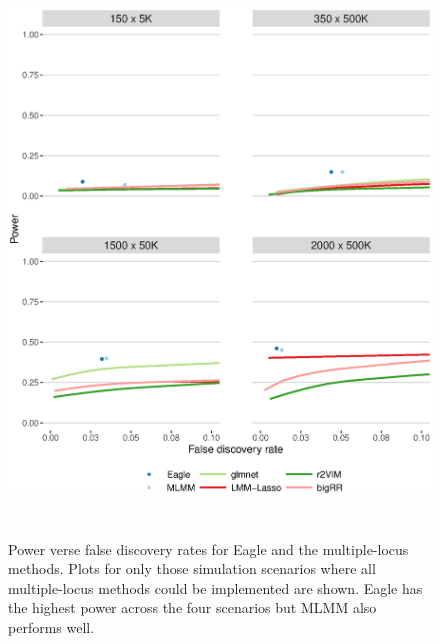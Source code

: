 \documentclass{article}
\begin{document}



\begin{figure}
\caption{Power verse false discovery rates for Eagle and the multiple-locus methods. Plots for only those simulation 
scenarios where all multiple-locus methods could be implemented are shown.  Eagle has the highest power across the four 
scenarios but MLMM also performs well. }
\label{figpowermultiple}
\begin{center}
\includegraphics[width=15cm, height=15cm]{power1main.eps}
\end{center}

\end{figure}
\end{document}

